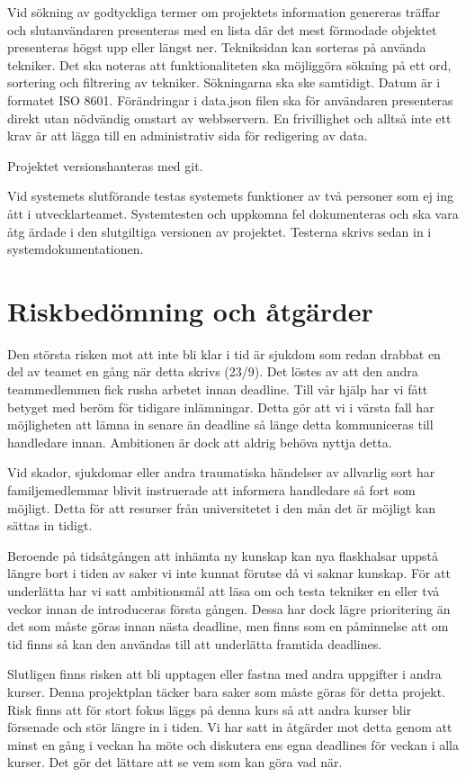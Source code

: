 \documentclass{TDP003mall}
\begin{document}
Vid sökning av godtyckliga termer om projektets information genereras träffar och
 slutanvändaren presenteras med en lista där det mest förmodade objektet presenteras
 högst upp eller längst ner. Tekniksidan kan sorteras på använda tekniker. Det ska
 noteras att funktionaliteten ska möjliggöra sökning på ett ord, sortering och filtrering
 av tekniker. Sökningarna ska ske samtidigt. Datum är i formatet ISO 8601. Förändringar
 i data.json filen ska för användaren presenteras direkt utan nödvändig omstart av
 webbservern. En frivillighet och alltså inte ett krav är att lägga till en administrativ
 sida för redigering av data.

Projektet versionshanteras med git.

Vid systemets slutförande testas systemets funktioner av två personer som ej ing
ått i utvecklarteamet. Systemtesten och uppkomna fel dokumenteras och ska vara åtg
ärdade i den slutgiltiga versionen av projektet. Testerna skrivs sedan in i systemdokumentationen.

\section{Riskbedömning och åtgärder}
Den största risken mot att inte bli klar i tid är sjukdom som redan drabbat en del av teamet en gång när detta skrivs (23/9). Det löstes av att den andra teammedlemmen fick rusha arbetet innan deadline. Till vår hjälp har vi fått betyget med beröm för tidigare inlämningar. Detta gör att vi i värsta fall har möjligheten att lämna in senare än deadline så länge detta kommuniceras till handledare innan. Ambitionen är dock att aldrig behöva nyttja detta.

Vid skador, sjukdomar eller andra traumatiska händelser av allvarlig sort har familjemedlemmar blivit instruerade att informera handledare så fort som möjligt. Detta för att resurser från universitetet i den mån det är möjligt kan sättas in tidigt.

Beroende på tidsåtgången att inhämta ny kunskap kan nya flaskhalsar uppstå längre bort i tiden av saker vi inte kunnat förutse då vi saknar kunskap. För att underlätta har vi satt ambitionsmål att läsa om och testa tekniker en eller två veckor innan de introduceras första gången. Dessa har dock lägre prioritering än det som måste göras innan nästa deadline, men finns som en påminnelse att om tid finns så kan den användas till att underlätta framtida deadlines.

Slutligen finns risken att bli upptagen eller fastna med andra uppgifter i andra kurser. Denna projektplan täcker bara saker som måste göras för detta projekt. Risk finns att för stort fokus läggs på denna kurs så att andra kurser blir försenade och stör längre in i tiden. Vi har satt in åtgärder mot detta genom att minst en gång i veckan ha möte och diskutera ens egna deadlines för veckan i alla kurser. Det gör det lättare att se vem som kan göra vad när.
\end{document}
